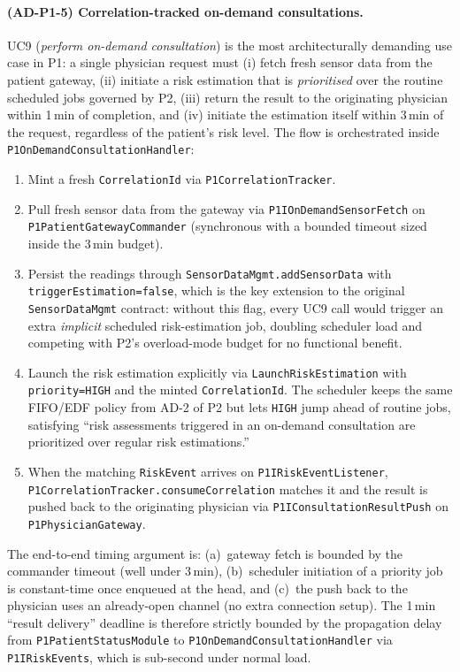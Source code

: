 \paragraph{(AD-P1-5) Correlation-tracked on-demand consultations.}
UC9 (\emph{perform on-demand consultation}) is the most architecturally
demanding use case in P1: a single physician request must (i) fetch fresh
sensor data from the patient gateway, (ii) initiate a risk estimation
that is \emph{prioritised} over the routine scheduled jobs governed by
P2, (iii) return the result to the originating physician within 1\,min of
completion, and (iv) initiate the estimation itself within 3\,min of the
request, regardless of the patient's risk level. The flow is orchestrated
inside \texttt{P1OnDemandConsultationHandler}:
\begin{enumerate}
  \item Mint a fresh \texttt{CorrelationId} via
        \texttt{P1CorrelationTracker}.
  \item Pull fresh sensor data from the gateway via
        \texttt{P1IOnDemandSensorFetch} on
        \texttt{P1PatientGatewayCommander} (synchronous with a bounded
        timeout sized inside the 3\,min budget).
  \item Persist the readings through
        \texttt{SensorDataMgmt.addSensorData} with
        \texttt{triggerEstimation=false}, which is the key extension to
        the original \texttt{SensorDataMgmt} contract: without this flag,
        every UC9 call would trigger an extra \emph{implicit} scheduled
        risk-estimation job, doubling scheduler load and competing with
        P2's overload-mode budget for no functional benefit.
  \item Launch the risk estimation explicitly via
        \texttt{LaunchRiskEstimation} with \texttt{priority=HIGH} and the
        minted \texttt{CorrelationId}. The scheduler keeps the same
        FIFO/EDF policy from AD-2 of P2 but lets \texttt{HIGH} jump ahead
        of routine jobs, satisfying ``risk assessments triggered in an
        on-demand consultation are prioritized over regular risk
        estimations.''
  \item When the matching \texttt{RiskEvent} arrives on
        \texttt{P1IRiskEventListener},
        \texttt{P1CorrelationTracker.consumeCorrelation} matches it and
        the result is pushed back to the originating physician via
        \texttt{P1IConsultationResultPush} on
        \texttt{P1PhysicianGateway}.
\end{enumerate}
The end-to-end timing argument is: (a)~gateway fetch is bounded by the
commander timeout (well under 3\,min), (b)~scheduler initiation of a
priority job is constant-time once enqueued at the head, and (c)~the push
back to the physician uses an already-open channel (no extra connection
setup). The 1\,min ``result delivery'' deadline is therefore strictly
bounded by the propagation delay from \texttt{P1PatientStatusModule} to
\texttt{P1OnDemandConsultationHandler} via \texttt{P1IRiskEvents}, which
is sub-second under normal load.

